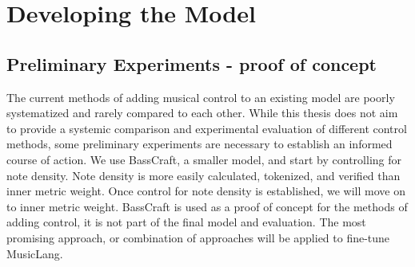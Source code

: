 \section{Developing the Model}


\subsection{Preliminary Experiments - proof of concept}
The current methods of adding musical control to an existing model are poorly systematized and rarely compared to each other. While this thesis does not aim to provide a systemic comparison and experimental evaluation of different control methods, some preliminary experiments are necessary to establish an informed course of action. We use BassCraft, a smaller model, and start by controlling for note density. Note density is more easily calculated, tokenized, and verified than inner metric weight. Once control for note density is established, we will move on to inner metric weight. BassCraft is used as a proof of concept for the methods of adding control, it is not part of the final model and evaluation. The most promising approach, or combination of approaches will be applied to fine-tune MusicLang. 

